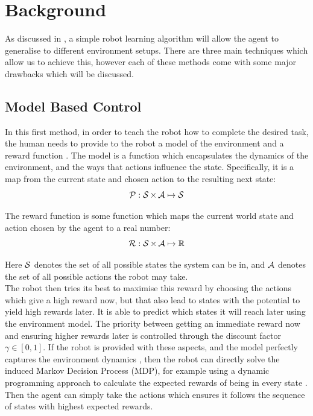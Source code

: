 \chapter{Background}
\label{chap:background}

As discussed in , a simple robot learning algorithm will allow the agent to generalise to different environment setups.
There are three main techniques which allow us to achieve this, however each of these methods come with some major drawbacks which will be discussed.

\section{Model Based Control}
\label{sec:model-based-control}
In this first method, in order to teach the robot how to complete the desired task, the human needs to provide to the robot a model of the environment and a reward function \cite{model-based-control}. The model is a function which encapsulates the dynamics of the environment, and the ways that actions influence the state. Specifically, it is a map from the current state and chosen action to the resulting next state:
$$\mathcal{P} : \operatorname{\mathcal{S}} \times \operatorname{\mathcal{A}} \mapsto \operatorname{\mathcal{S}}$$

The reward function is some function which maps the current world state and action chosen by the agent to a real number:
$$\operatorname{\mathcal{R}} : \operatorname{\mathcal{S}} \times \operatorname{\mathcal{A}} \mapsto \operatorname{\mathbb{R}}$$

Here $\operatorname{\mathcal{S}}$ denotes the set of all possible states the system can be in, and $\operatorname{\mathcal{A}}$ denotes the set of all possible actions the robot may take.\\

The robot then tries its best to maximise this reward by choosing the actions which give a high reward now, but that also lead to states with the potential to yield high rewards later. It is able to predict which states it will reach later using the environment model. The priority between getting an immediate reward now and ensuring higher rewards later is controlled through the discount factor $\gamma \in [0,1]$. If the robot is provided with these aspects, and the model perfectly captures the environment dynamics , then the robot can directly solve the induced Markov Decision Process (MDP), for example using a dynamic programming approach to calculate the expected rewards of being in every state \cite{rl-intro-book}. Then the agent can simply take the actions which ensures it follows the sequence of states with highest expected rewards.\\

